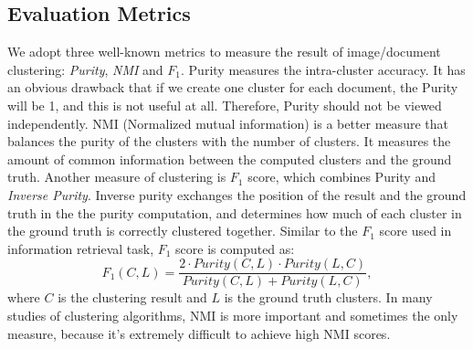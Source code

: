 \subsection{Evaluation Metrics}
We adopt three well-known metrics to measure the result of image/document clustering:
\emph{Purity}, \emph{NMI} and \emph{$F_1$}.
Purity measures the intra-cluster accuracy.
It has an obvious drawback
that if we create one cluster for each document, the Purity will be 1, and
this is not useful at all. Therefore, Purity should not be viewed independently.
NMI (Normalized mutual information) is a better measure that
balances the purity of the clusters with the number of clusters.
It measures the amount of common information between the computed clusters and
the ground truth.
Another measure of clustering is $F_1$ score,
which combines Purity and \emph{Inverse Purity}.
Inverse purity exchanges the position of the result and the ground truth
in the the purity computation, and
determines how much of each cluster in the ground truth is correctly
clustered together. Similar to the
$F_1$ score used in information retrieval task, $F_1$ score is computed as:
\begin{equation}
F_1(C,L)=\frac{2\cdot Purity(C,L)\cdot Purity(L,C)}{Purity(C,L)+Purity(L,C)},
\end{equation}
where $C$ is the clustering result and $L$ is the ground truth clusters.
In many studies of clustering algorithms, NMI
is more important and sometimes the only measure,
because it's extremely difficult to achieve high NMI scores.

